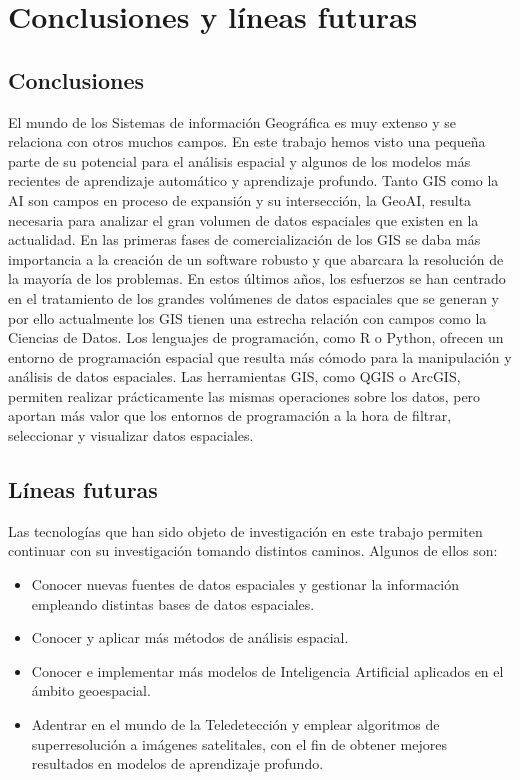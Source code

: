 \chapter*{Conclusiones y líneas futuras}
\setcounter{chapter}{7} 
\setcounter{section}{0}

\section{Conclusiones}
El mundo de los Sistemas de información Geográfica es muy extenso y se relaciona con otros muchos campos. 
En este trabajo hemos visto una pequeña parte de su potencial para el análisis espacial y 
algunos de los modelos más recientes de aprendizaje automático y aprendizaje profundo. 
Tanto GIS como la AI son campos en proceso de expansión y su intersección, la GeoAI, resulta necesaria para analizar el gran volumen de datos espaciales que existen en la actualidad. 
En las primeras fases de comercialización de los GIS se daba más importancia a la creación de un software robusto y que abarcara la resolución de la mayoría de los problemas.
En estos últimos años, los esfuerzos se han centrado en el tratamiento de los grandes volúmenes de datos espaciales que se generan y por ello actualmente los GIS 
tienen una estrecha relación con campos como la Ciencias de Datos.
Los lenguajes de programación, como R o Python, ofrecen un entorno de programación espacial que resulta más cómodo para la manipulación y análisis de datos espaciales.
Las herramientas GIS, como QGIS o ArcGIS, permiten realizar prácticamente las mismas operaciones sobre los datos, pero aportan más valor que los entornos de programación 
a la hora de filtrar, seleccionar y visualizar datos espaciales. 

\section{Líneas futuras}
Las tecnologías que han sido objeto de investigación en este trabajo permiten continuar con su investigación tomando distintos caminos.
Algunos de ellos son:
\begin{itemize}
    \item Conocer nuevas fuentes de datos espaciales y gestionar la información empleando distintas bases de datos espaciales.
    \item Conocer y aplicar más métodos de análisis espacial.
    \item Conocer e implementar más modelos de Inteligencia Artificial aplicados en el ámbito geoespacial.
    \item Adentrar en el mundo de la Teledetección y emplear algoritmos de superresolución a imágenes satelitales, con el fin de obtener mejores resultados en modelos de aprendizaje profundo. 
\end{itemize} 

